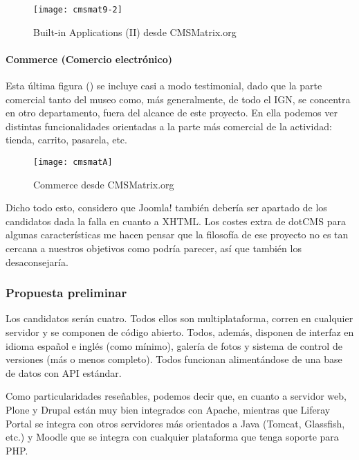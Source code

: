 \begin{figure}
\begin{narrow}{-0.12\linewidth}{-0.12\linewidth}
\centering
\texttt{[image: cmsmat9-2]}
\caption{Built-in Applications (II) desde CMSMatrix.org}
\label{fig:cmsmat9-2}
\end{narrow}
\end{figure}

\paragraph{Commerce (Comercio electrónico)}


\par Esta última figura (\label{fig:cmsmatA}) se incluye casi a modo testimonial, dado que la parte comercial tanto del museo como, más generalmente, de todo el IGN, se concentra en otro departamento, fuera del alcance de este proyecto. En ella podemos ver distintas funcionalidades orientadas a la parte más comercial de la actividad: tienda, carrito, pasarela, etc.

\begin{figure}
\begin{narrow}{-0.12\linewidth}{-0.12\linewidth}
\centering
\texttt{[image: cmsmatA]}
\caption{Commerce desde CMSMatrix.org}
\label{fig:cmsmatA}
\end{narrow}
\end{figure}

\par Dicho todo esto, considero que Joomla! también debería ser apartado de los candidatos dada la falla en cuanto a XHTML. Los costes extra de dotCMS para algunas características me hacen pensar que la filosofía de ese proyecto no es tan cercana a nuestros objetivos como podría parecer, así que también los desaconsejaría.


\subsubsection{Propuesta preliminar}
\par Los candidatos serán cuatro. Todos ellos son multiplataforma, corren en cualquier servidor y se componen de código abierto. Todos, además, disponen de interfaz en idioma español e inglés (como mínimo), galería de fotos y sistema de control de versiones (más o menos completo). Todos funcionan alimentándose de una base de datos con API estándar.
\par Como particularidades reseñables, podemos decir que, en cuanto a servidor web, Plone y Drupal están muy bien integrados con Apache, mientras que Liferay Portal se integra con otros servidores más orientados a Java (Tomcat, Glassfish, etc.) y Moodle que se integra con cualquier plataforma que tenga soporte para PHP.


